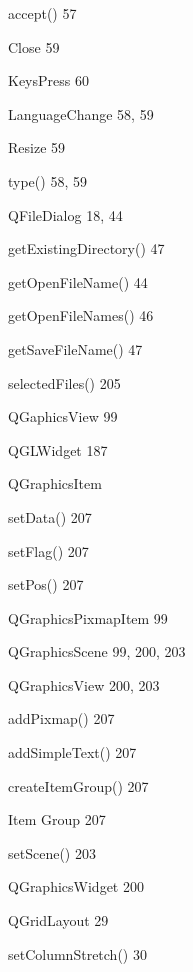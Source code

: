 \documentclass{book}
\renewcommand\subitem{\par}
\begin{document}
\begin{multicols}{2}
\begin{osp-index}
    \subitem accept()\hspace{1mm} 57
    \subitem Close\hspace{1mm} 59
    \subitem KeysPress\hspace{1mm} 60
    \subitem LanguageChange\hspace{1mm} 58, 59
    \subitem Resize\hspace{1mm} 59
    \subitem type()\hspace{1mm} 58, 59
  \item QFileDialog\hspace{1mm} 18, 44
    \subitem getExistingDirectory()\hspace{1mm} 47
    \subitem getOpenFileName()\hspace{1mm} 44
    \subitem getOpenFileNames()\hspace{1mm} 46
    \subitem getSaveFileName()\hspace{1mm} 47
    \subitem selectedFiles()\hspace{1mm} 205
  \item QGaphicsView\hspace{1mm} 99
  \item QGLWidget\hspace{1mm} 187
  \item QGraphicsItem
    \subitem setData()\hspace{1mm} 207
    \subitem setFlag()\hspace{1mm} 207
    \subitem setPos()\hspace{1mm} 207
  \item QGraphicsPixmapItem\hspace{1mm} 99
  \item QGraphicsScene\hspace{1mm} 99, 200, 203
  \item QGraphicsView\hspace{1mm} 200, 203
    \subitem addPixmap()\hspace{1mm} 207
    \subitem addSimpleText()\hspace{1mm} 207
    \subitem createItemGroup()\hspace{1mm} 207
    \subitem Item Group\hspace{1mm} 207
    \subitem setScene()\hspace{1mm} 203
  \item QGraphicsWidget\hspace{1mm} 200
  \item QGridLayout\hspace{1mm} 29
    \subitem setColumnStretch()\hspace{1mm} 30

\end{osp-index}
\end{multicols}
\end{document}

